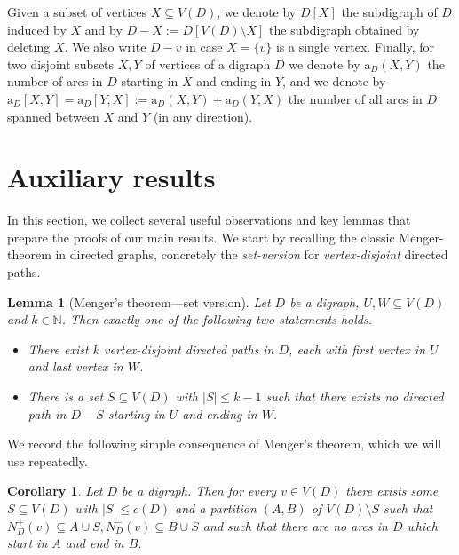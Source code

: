 \documentclass[a4paper,10pt]{article}
\newtheorem{lemma}[theorem]{Lemma}
\newtheorem{corollary}[theorem]{Corollary}
\begin{document}
Given a subset of vertices $X\subseteq V(D)$, we denote by $D[X]$ the subdigraph of $D$ induced by $X$ and by $D-X:=D[V(D)\setminus X]$ the subdigraph obtained by deleting $X$. We also write $D-v$ in case $X=\{v\}$ is a single vertex. Finally, for two disjoint subsets $X,Y$ of vertices of a digraph $D$ we denote by $\mathrm{a}_D(X,Y)$ the number of arcs in $D$ starting in $X$ and ending in $Y$, and we denote by $\mathrm{a}_D[X,Y]=\mathrm{a}_D[Y,X]:=\mathrm{a}_D(X,Y)+\mathrm{a}_D(Y,X)$ the number of all arcs in $D$ spanned between $X$ and $Y$ (in any direction).

\section{Auxiliary results}\label{sec:aux}
In this section, we collect several useful observations and key lemmas that prepare the proofs of our main results. We start by recalling the classic Menger-theorem in directed graphs, concretely the \emph{set-version} for \emph{vertex-disjoint} directed paths.
\begin{lemma}[Menger's theorem---set version]\label{lem:menger}
Let $D$ be a digraph, $U,W\subseteq V(D)$ and $k\in \mathbb{N}$. Then exactly one of the following two statements holds.
\begin{itemize}
    \item There exist $k$ vertex-disjoint directed paths in $D$, each with first vertex in $U$ and last vertex in $W$.
    \item There is a set $S\subseteq V(D)$ with $|S|\le k-1$ such that there exists no directed path in $D-S$ starting in $U$ and ending in $W$.
\end{itemize}
\end{lemma}
\noindent We record the following simple consequence of Menger's theorem, which we will use repeatedly.
\begin{corollary}\label{cor:sep}
    Let $D$ be a digraph. Then for every $v\in V(D)$ there exists some $S\subseteq V(D)$ with $|S|\le c(D)$ and a partition $(A,B)$ of $V(D)\setminus S$ such that $N_D^+(v)\subseteq A\cup S, N_D^-(v)\subseteq B\cup S$ and such that there are no arcs in $D$ which start in $A$ and end in $B$.
\end{corollary}
\end{document}

